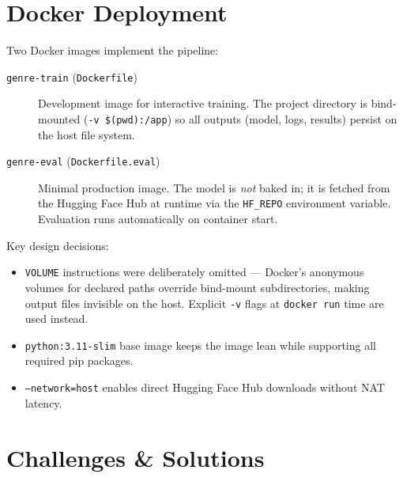 \documentclass[12pt,a4paper]{article}
\begin{document}
\section{Docker Deployment}

Two Docker images implement the pipeline:

\begin{description}
    \item[\texttt{genre-train} (\texttt{Dockerfile})]
        Development image for interactive training.
        The project directory is bind-mounted (\texttt{-v \$(pwd):/app}) so
        all outputs (model, logs, results) persist on the host file system.

    \item[\texttt{genre-eval} (\texttt{Dockerfile.eval})]
        Minimal production image.  The model is \emph{not} baked in; it is
        fetched from the Hugging Face Hub at runtime via the \texttt{HF\_REPO}
        environment variable.  Evaluation runs automatically on container start.
\end{description}

\noindent Key design decisions:
\begin{itemize}
    \item \texttt{VOLUME} instructions were deliberately omitted — Docker's
          anonymous volumes for declared paths override bind-mount subdirectories,
          making output files invisible on the host.  Explicit \texttt{-v} flags
          at \texttt{docker run} time are used instead.
    \item \texttt{python:3.11-slim} base image keeps the image lean while
          supporting all required pip packages.
    \item \texttt{--network=host} enables direct Hugging Face Hub downloads
          without NAT latency.
\end{itemize}

\section{Challenges \& Solutions}
\end{document}
